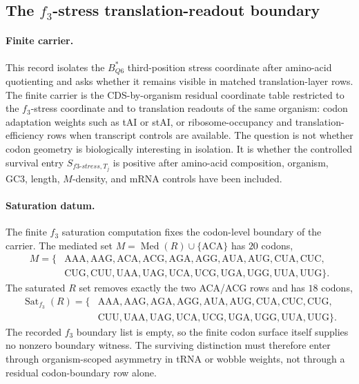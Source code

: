 \subsection{The $f_3$-stress translation-readout boundary}
\label{sec:q6-f3-stress-wobble-broken-translation-readout-cross-layer}

\paragraph{Finite carrier.}
This record isolates the $B^*_{Q6}$ third-position stress coordinate after amino-acid quotienting and asks whether it remains visible in matched translation-layer rows.  The finite carrier is the CDS-by-organism residual coordinate table restricted to the $f_3$-stress coordinate and to translation readouts of the same organism: codon adaptation weights such as tAI or stAI, or ribosome-occupancy and translation-efficiency rows when transcript controls are available.  The question is not whether codon geometry is biologically interesting in isolation.  It is whether the controlled survival entry $S_{f3\text{-}stress,T_j}$ is positive after amino-acid composition, organism, GC3, length, $M$-density, and mRNA controls have been included.

\paragraph{Saturation datum.}
The finite $f_3$ saturation computation fixes the codon-level boundary of the carrier.  The mediated set $M=\operatorname{Med}(R)\cup\{\mathrm{ACA}\}$ has $20$ codons,
$$
\begin{aligned}
M=\{&\mathrm{AAA},\mathrm{AAG},\mathrm{ACA},\mathrm{ACG},\mathrm{AGA},\mathrm{AGG},\mathrm{AUA},\mathrm{AUG},\mathrm{CUA},\mathrm{CUC},\\
&\mathrm{CUG},\mathrm{CUU},\mathrm{UAA},\mathrm{UAG},\mathrm{UCA},\mathrm{UCG},\mathrm{UGA},\mathrm{UGG},\mathrm{UUA},\mathrm{UUG}\}.
\end{aligned}
$$
The saturated $R$ set removes exactly the two ACA/ACG rows and has $18$ codons,
$$
\begin{aligned}
\operatorname{Sat}_{f_3}(R)=\{&\mathrm{AAA},\mathrm{AAG},\mathrm{AGA},\mathrm{AGG},\mathrm{AUA},\mathrm{AUG},\mathrm{CUA},\mathrm{CUC},\mathrm{CUG},\\
&\mathrm{CUU},\mathrm{UAA},\mathrm{UAG},\mathrm{UCA},\mathrm{UCG},\mathrm{UGA},\mathrm{UGG},\mathrm{UUA},\mathrm{UUG}\}.
\end{aligned}
$$
The recorded $f_3$ boundary list is empty, so the finite codon surface itself supplies no nonzero boundary witness.  The surviving distinction must therefore enter through organism-scoped asymmetry in tRNA or wobble weights, not through a residual codon-boundary row alone.

